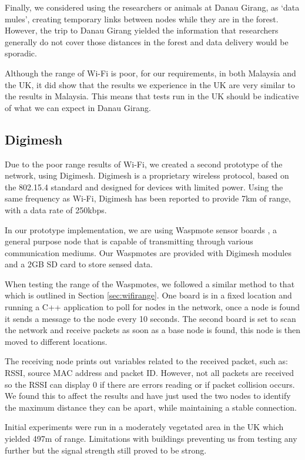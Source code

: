 Finally, we considered using the researchers or animals at Danau Girang, as `data mules', creating temporary links between nodes while they are in the forest. However, the trip to Danau Girang yielded the information that researchers generally do not cover those distances in the forest and data delivery would be sporadic.
			
Although the range of Wi-Fi is poor, for our requirements, in both Malaysia and the UK, it did show that the results we experience in the UK are very similar to the results in Malaysia. This means that tests run in the UK should be indicative of what we can expect in Danau Girang.

\subsection{Digimesh}
		Due to the poor range results of Wi-Fi, we created a second prototype of the network, using Digimesh. Digimesh is a proprietary wireless protocol, based on the 802.15.4 standard and designed for devices with limited power. Using the same frequency as Wi-Fi, Digimesh has been reported to provide 7km of range, with a data rate of 250kbps.
		
In our prototype implementation, we are using Waspmote sensor boards \cite{Waspmote}, a general purpose node that is capable of transmitting through various communication mediums. Our Waspmotes are provided with Digimesh modules and a 2GB SD card to store sensed data.
		
When testing the range of the Waspmotes, we followed a similar method to that which is outlined in Section \ref{sec:wifirange}. One board is in a fixed location and running a C++ application to poll for nodes in the network, once a node is found it sends a message to the node every 10 seconds. The second board is set to scan the network and receive packets as soon as a base node is found, this node is then moved to different locations.
			
The receiving node prints out variables related to the received packet, such as: RSSI, source MAC address and packet ID. However, not all packets are received so the RSSI can display 0 if there are errors reading or if packet collision occurs. We found this to affect the results and have just used the two nodes to identify the maximum distance they can be apart, while maintaining a stable connection.
					
Initial experiments were run in a moderately vegetated area in the UK which yielded 497m of range. Limitations with buildings preventing us from testing any further but the signal strength still proved to be strong.
			
